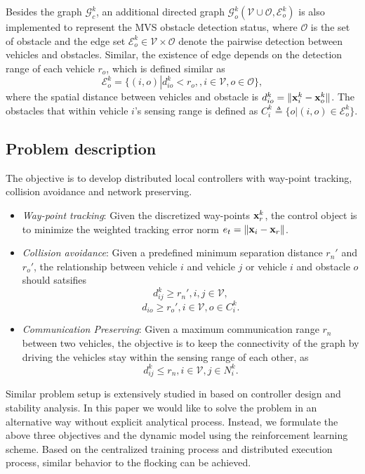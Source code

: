 \documentclass[letterpaper,10 pt,conference]{ieeeconf}
\begin{document}
Besides the graph $\mathcal{G}_c^k$, an additional directed graph $\mathcal{G}_o^k(\mathcal{V}\cup \mathcal{O}, \mathcal{E}_o^k)$ is also implemented to represent the MVS obstacle  detection  status, where $\mathcal{O}$ is the set of obstacle and the edge set $\mathcal{E}_o^k\in \mathcal{V}\times \mathcal{O}$ denote the pairwise detection between vehicles and obstacles. Similar, the existence of edge depends on the detection range of each vehicle $r_o$, which is defined similar as 
\begin{equation}
\mathcal{E}_o^k=\{\left(i,o\right)\left.\right|d_{io}^k<r_o, , i\in \mathcal{V}, o\in \mathcal{O}\},
\label{graph_o}
\end{equation}
where the spatial distance between vehicles and obstacle is $d_{io}^k =\|\mathbf{x}_i^k-\mathbf{x}_o^k\|$. 
The obstacles that within vehicle $i$'s sensing range is defined as $C_i^k\triangleq\{{o|(i,o)\in \mathcal{E}_o^k}\}$.
\subsection{Problem description}
The objective is to develop distributed local controllers with way-point tracking, collision avoidance and network preserving.
\begin{itemize}
	\item {\it Way-point tracking}: Given the discretized way-points $\mathbf{x}_r^k$, the control object is to minimize the weighted tracking error norm $e_{t} = \|\mathbf{x}_i - \mathbf{x}_r\|$.
	\item {\it Collision avoidance}: Given a predefined minimum separation distance $r_n'$ and $r_o'$, the relationship between vehicle $i$ and vehicle $j$ or vehicle $i$ and obstacle $o$ should satsifies
	\[d_{ij}^k\ge r_n', i,j\in \mathcal{V},\]
	\[d_{io}\ge r_o', i\in \mathcal{V}, o\in C_i^k.\]
	\item{\it Communication Preserving}: Given a maximum communication range $r_n$ between two vehicles, the objective is to keep the connectivity of the graph by driving the vehicles stay within the sensing range of each other, as 
	\[d^k_{ij}\le r_n, i\in \mathcal{V}, j\in N^k_i.\]
\end{itemize}
Similar problem setup is extensively studied in \cite{olfati2006flocking} based on controller design and stability analysis. In this paper we would like to solve the problem in an alternative way without explicit analytical process. Instead, we formulate the above three objectives and the dynamic model using the reinforcement learning scheme. Based on the centralized training process and distributed execution process, similar behavior to the flocking \cite{olfati2006flocking} can be achieved.
\end{document}
